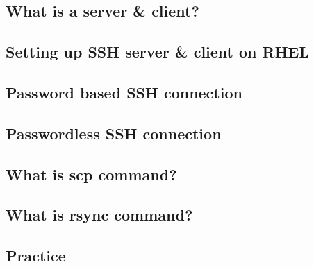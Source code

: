 \documentclass[14pt,fleqn]{extbook} %
\begin{document}
\subsection{What is a server \& client?}

\subsection{Setting up SSH server \& client on RHEL}

\subsection{Password based SSH connection}

\subsection{Passwordless SSH connection}

\subsection{What is scp command?}

\subsection{What is rsync command?}

\subsection{Practice}

\end{document}

